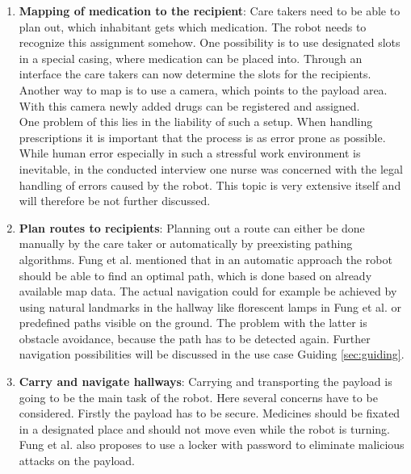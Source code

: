 \documentclass[plainarticle,zihtitle,english,final,hyperref,utf8]{zihpub}
\begin{document}
\begin{enumerate}
    \item \textbf{Mapping of medication to the recipient}: Care takers need to be able to plan out, which inhabitant gets which medication. The robot needs to recognize this assignment somehow. One possibility is to use designated slots in a special casing, where medication can be placed into. Through an interface the care takers can now determine the slots for the recipients. Another way to map is to use a camera, which points to the payload area. With this camera newly added drugs can be registered and assigned.\\
    \newline
    One problem of this lies in the liability of such a setup. When handling prescriptions it is important that the process is as error prone as possible. While human error especially in such a stressful work environment is inevitable, in the conducted interview one nurse was concerned with the legal handling of errors caused by the robot. This topic is very extensive itself and will therefore be not further discussed. \\
    \item \textbf{Plan routes to recipients}: Planning out a route can either be done manually by the care taker or automatically by preexisting pathing algorithms. Fung et al. \cite{Fung2003} mentioned that in an automatic approach the robot should be able to find an optimal path, which is done based on already available map data. The actual navigation could for example be achieved by using natural landmarks in the hallway like florescent lamps in Fung et al. or predefined paths visible on the ground. The problem with the latter is obstacle avoidance, because the path has to be detected again. Further navigation possibilities will be discussed in the use case Guiding \ref{sec:guiding}.\\
    \item \textbf{Carry and navigate hallways}: Carrying and transporting the payload is going to be the main task of the robot. Here several concerns have to be considered. Firstly the payload has to be secure. Medicines should be fixated in a designated place and should not move even while the robot is turning. Fung et al. also proposes to use a locker with password to eliminate malicious attacks on the payload. \\
    \newline

\end{enumerate}
\end{document}
